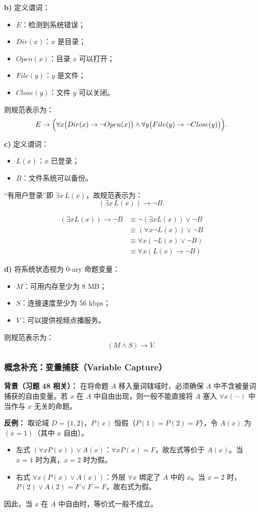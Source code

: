 \documentclass[11pt,UTF8]{article}
\begin{document}
\textbf{b)} 定义谓词：
\begin{itemize}
    \item $E$：检测到系统错误；
    \item $Dir(x)$：$x$ 是目录；
    \item $Open(x)$：目录 $x$ 可以打开；
    \item $File(y)$：$y$ 是文件；
    \item $Close(y)$：文件 $y$ 可以关闭。
\end{itemize}
则规范表示为：
\[ E \to \Bigl(\forall x \bigl(Dir(x) \to \neg Open(x)\bigr) \land \forall y \bigl(File(y) \to \neg Close(y)\bigr)\Bigr). \]

\textbf{c)} 定义谓词：
\begin{itemize}
    \item $L(x)$：$x$ 已登录；
    \item $B$：文件系统可以备份。
\end{itemize}
``有用户登录''即 $\exists x\, L(x)$，故规范表示为：
\[ (\exists x\, L(x)) \to \neg B. \]

\[
\begin{aligned}
(\exists x L(x)) \to \neg B &\equiv \neg(\exists x L(x)) \vee \neg B \\
&\equiv (\forall x \neg L(x)) \vee \neg B \\
&\equiv \forall x (\neg L(x) \vee \neg B) \\
&\equiv \forall x (L(x) \to \neg B)
\end{aligned}
\]

\textbf{d)} 将系统状态视为 0-ary 命题变量：
\begin{itemize}
    \item $M$：可用内存至少为 8 MB；
    \item $S$：连接速度至少为 56 kbps；
    \item $V$：可以提供视频点播服务。
\end{itemize}
则规范表示为：
\[ (M \land S) \to V. \]

\subsubsection*{概念补充：变量捕获（Variable Capture）}
\textbf{背景（习题 48 相关）：} 在将命题 $A$ 移入量词辖域时，必须确保 $A$ 中不含被量词捕获的自由变量。若 $x$ 在 $A$ 中自由出现，则一般不能直接将 $A$ 塞入 $\forall x(\cdots)$ 中当作与 $x$ 无关的命题。

\textbf{反例：} 取论域 $D=\{1,2\}$，$P(x)$ 恒假（$P(1)=P(2)=F$），令 $A(x)$ 为 $(x=1)$（其中 $x$ 自由）。
\begin{itemize}
    \item 左式 $(\forall x P(x)) \lor A(x)$：$\forall x P(x)=F$，故左式等价于 $A(x)$。当 $x=1$ 时为真，$x=2$ 时为假。
    \item 右式 $\forall x (P(x) \lor A(x))$：外层 $\forall x$ 绑定了 $A$ 中的 $x$。当 $x=2$ 时，$P(2)\lor A(2)=F\lor F=F$，故右式为假。
\end{itemize}
因此，当 $x$ 在 $A$ 中自由时，等价式一般不成立。
\end{document}
